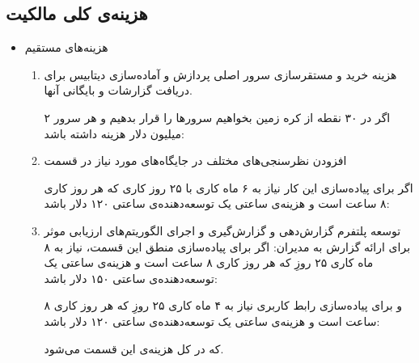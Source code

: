 \documentclass[12pt, dvipsnames, svgnames, x11names,]{article}
\begin{document}
\subsection{هزینه‌ی کلی مالکیت }
\begin{itemize}
    \item 
    هزینه‌های مستقیم
    
    \begin{enumerate}
        \item 
        هزینه خرید و مستقرسازی سرور اصلی پردازش  و آماده‌سازی دیتابیس برای دریافت گزارشات و بایگانی آنها.
        
        اگر در ۳۰ نقطه از کره زمین بخواهیم سرور‌ها را قرار بدهیم و هر سرور ۲ میلیون دلار هزینه داشته باشد:
        
        \item 
        افزودن نظرسنجی‌های مختلف در جایگاه‌های مورد نیاز در قسمت 
        
        اگر برای پیاده‌سازی این کار نیاز به ۶ ماه کاری با ۲۵ روز کاری که هر روز کاری ۸ ساعت است و هزینه‌ی ساعتی یک توسعه‌دهنده‌ی  ساعتی ۱۲۰ دلار باشد:
        \begin{flushleft}
        \end{flushleft}
        
        \item
        توسعه پلتفرم گزارش‌دهی و گزارش‌گیری و اجرای الگوریتم‌های ارزیابی موثر برای ارائه گزارش به مدیران:
        اگر برای پیاده‌سازی منطق این قسمت، نیاز به ۸ ماه کاری ۲۵ روزِ که هر روز کاری ۸ ساعت است و هزینه‌ی ساعتی یک توسعه‌دهنده‌ی  ساعتی ۱۵۰ دلار باشد:
        \begin{flushleft}
        \end{flushleft}
        
        و برای پیاده‌سازی رابط کاربری نیاز به ۴ ماه کاری ۲۵ روزِ که هر روز کاری ۸ ساعت است و هزینه‌ی ساعتی یک توسعه‌دهنده‌ی  ساعتی ۱۲۰ دلار باشد:
        \begin{flushleft}
        \end{flushleft}
        
        که در کل 
        هزینه‌ی این قسمت می‌شود.
    \end{enumerate}



\end{itemize}
\end{document}
